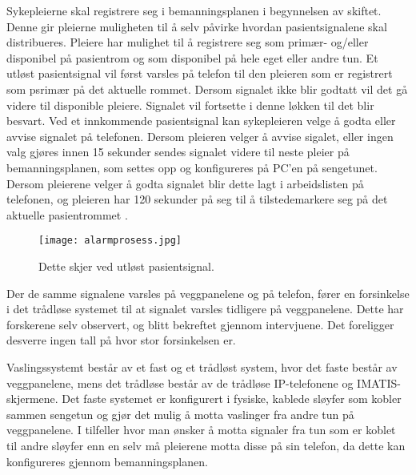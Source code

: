 \noindent
Sykepleierne skal registrere seg i bemanningsplanen i begynnelsen av skiftet. Denne gir pleierne muligheten til å selv påvirke hvordan pasientsignalene skal distribueres. Pleiere har mulighet til å registrere seg som primær- og/eller disponibel på pasientrom og som disponibel på hele eget eller andre tun. Et utløst pasientsignal vil først varsles på telefon til den pleieren som er registrert som psrimær på det aktuelle rommet. Dersom signalet ikke blir godtatt vil det gå videre til disponible pleiere. Signalet vil fortsette i denne løkken til det blir besvart.
Ved et innkommende pasientsignal kan sykepleieren velge å godta eller avvise signalet på telefonen. Dersom pleieren velger å avvise sigalet, eller ingen valg gjøres innen 15 sekunder sendes signalet videre til neste pleier på bemanningsplanen, som settes opp og konfigureres på PC'en på sengetunet. Dersom pleierene velger å godta signalet blir dette lagt i arbeidslisten på telefonen, og pleieren har 120 sekunder på seg til å tilstedemarkere seg på det aktuelle pasientrommet \citep{BrukermanualforPasientsignalogPasientsignalapplikasjon}.

\begin{figure}[H]
\centering
\texttt{[image: alarmprosess.jpg]}
\caption{Dette skjer ved utløst pasientsignal.}
\label{fig:detteskjer}
\end{figure}

\noindent
Der de samme signalene varsles på veggpanelene og på telefon, fører en forsinkelse i det trådløse systemet til at signalet varsles tidligere på veggpanelene. Dette har forskerene selv observert, og blitt bekreftet gjennom intervjuene. Det foreligger desverre ingen tall på hvor stor forsinkelsen er. 

\noindent
Vaslingssystemt består av et fast og et trådløst system, hvor det faste består av veggpanelene, mens det trådløse består av de trådløse IP-telefonene og IMATIS-skjermene. Det faste systemet er konfigurert i fysiske, kablede sløyfer som kobler sammen sengetun og gjør det mulig å motta vaslinger fra andre tun på veggpanelene. I tilfeller hvor man ønsker å motta signaler fra tun som er koblet til andre sløyfer enn en selv må pleierene motta disse på sin telefon, da dette kan konfigureres gjennom bemanningsplanen.
